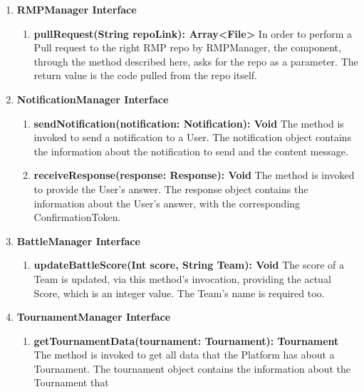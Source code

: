 \begin{enumerate}
\begin{enumerate}[label=$\bullet$]
        \end{enumerate}
    \item \textbf{RMPManager Interface}
        \begin{enumerate}[label=$\bullet$]
            \item \textbf{pullRequest(String repoLink): Array<File>} In order to perform a Pull request to the right RMP repo by RMPManager, the component, through the method described here, asks for the repo as a parameter. The return 
            value is the code pulled from the repo itself.
        \end{enumerate} 
    \item \textbf{NotificationManager Interface}
        \begin{enumerate}[label=$\bullet$]
            \item \textbf{sendNotification(notification: Notification): Void} The method is invoked to send a notification to a User. The notification object contains the information about the notification to send and the content
            message.
            \item \textbf{receiveResponse(response: Response): Void} The method is invoked to provide the User's answer. The response object contains the information about the User's answer, with the corresponding ConfirmationToken.
        \end{enumerate}
    \item \textbf{BattleManager Interface}
        \begin{enumerate}[label=$\bullet$]
            \item \textbf{updateBattleScore(Int score, String Team): Void} The score of a Team is updated, via this method's invocation, providing the actual Score, which is an integer value. The Team's name is required too.
        \end{enumerate}
    \item \textbf{TournamentManager Interface}
        \begin{enumerate}[label=$\bullet$]
            \item \textbf{getTournamentData(tournament: Tournament): Tournament} The method is invoked to get all data that the Platform has about a Tournament. The tournament object contains the information about the Tournament that 

\end{enumerate}
\end{enumerate}
